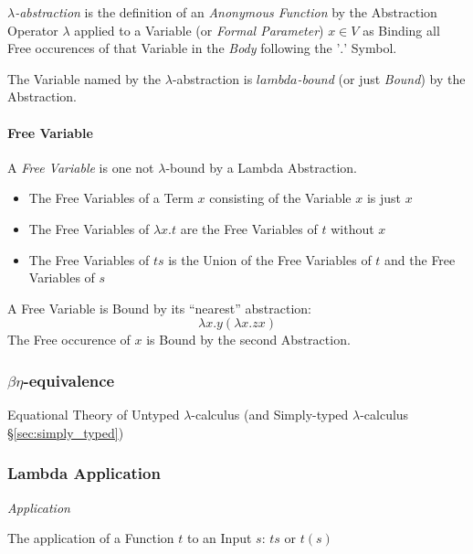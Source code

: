 \emph{$\lambda$-abstraction} is the definition of an \emph{Anonymous
  Function} by the Abstraction Operator $\lambda$ applied to a
Variable (or \emph{Formal Parameter}) $x \in V$ as Binding all Free
occurences of that Variable in the \emph{Body} following the '$.$'
Symbol.

The Variable named by the $\lambda$-abstraction is
\emph{$lambda$-bound} (or just \emph{Bound}) by the Abstraction.



\paragraph{Free Variable}\label{sec:free_variable}\hfill

A \emph{Free Variable} is one not $\lambda$-bound by a Lambda
Abstraction.

\begin{itemize}
  \item The Free Variables of a Term $x$ consisting of the Variable
    $x$ is just $x$
  \item The Free Variables of $\lambda x.t$ are the Free Variables of
    $t$ without $x$
  \item The Free Variables of $ts$ is the Union of the Free Variables
    of $t$ and the Free Variables of $s$
\end{itemize}

A Free Variable is Bound by its ``nearest'' abstraction:
\[
  \lambda x.y (\lambda x.z x)
\]
The Free occurence of $x$ is Bound by the second Abstraction.



\subsubsection{$\beta\eta$-equivalence}\label{sec:beta_eta}

Equational Theory of Untyped $\lambda$-calculus (and Simply-typed
$\lambda$-calculus \S\ref{sec:simply_typed})



\subsubsection{Lambda Application}\label{sec:lambda_application}

\emph{Application}

The application of a Function $t$ to an Input $s$: $ts$ or $t(s)$




